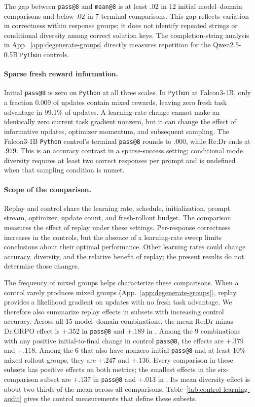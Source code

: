 The gap between \texttt{pass@8} and \texttt{mean@8} is at least $.02$ in
12 initial model--domain comparisons and below $.02$ in
7 terminal comparisons. This gap reflects variation in
correctness within response groups; it does not identify repeated strings
or conditional diversity among correct solution keys. The completion-string
analysis in App.~\ref{app:degenerate-groups} directly measures repetition
for the Qwen2.5-0.5B \texttt{Python} controls.

\paragraph{Sparse fresh reward information.}
Initial \texttt{pass@8} is zero on \texttt{Python} at all three
scales. In \texttt{Python} at Falcon3-1B, only a fraction 0.009 of
updates contain mixed rewards, leaving zero fresh task advantage in
99.1\% of updates. A learning-rate change cannot make an
identically zero current task gradient nonzero, but it can change the effect
of informative updates, optimizer momentum, and subsequent sampling.
The Falcon3-1B \texttt{Python} control's terminal \texttt{pass@8} rounds to $.000$, while Re:Dr
ends at $.979$. This is an accuracy contrast in a sparse-success setting;
conditional mode diversity requires at least two correct responses per
prompt and is undefined when that sampling condition is unmet.

\paragraph{Scope of the comparison.}
Replay and control share the learning rate, schedule, initialization,
prompt stream, optimizer, update count, and fresh-rollout budget.
The comparison measures the effect of replay under these settings.
Per-response correctness increases in the controls, but the absence of a
learning-rate sweep limits conclusions about their optimal performance.
Other learning rates could change accuracy, diversity, and the relative
benefit of replay; the present results do not determine those changes.

The frequency of mixed groups helps characterize these comparisons.
When a control rarely produces mixed groups (App.~\ref{app:degenerate-groups}),
replay provides a likelihood gradient on updates with no fresh task advantage.
We therefore also summarize replay effects in subsets with increasing
control accuracy. Across all 15 model--domain combinations, the mean
Re:Dr minus Dr.GRPO effect is $+.352$ in \texttt{pass@8} and $+.189$
in \pmd{}. Among the 9 combinations with any positive initial-to-final
change in control \texttt{pass@8}, the effects are $+.379$ and $+.118$.
Among the 6 that also have nonzero initial \texttt{pass@8} and at least
10\% mixed rollout groups, they are $+.247$ and $+.136$. Every comparison
in these subsets has positive effects on both metrics; the smallest effects
in the six-comparison subset are $+.137$ in \texttt{pass@8} and $+.013$
in \pmd{}. Its mean diversity effect is about two thirds of the mean
across all comparisons. Table~\ref{tab:control-learning-audit} gives the
control measurements that define these subsets.

